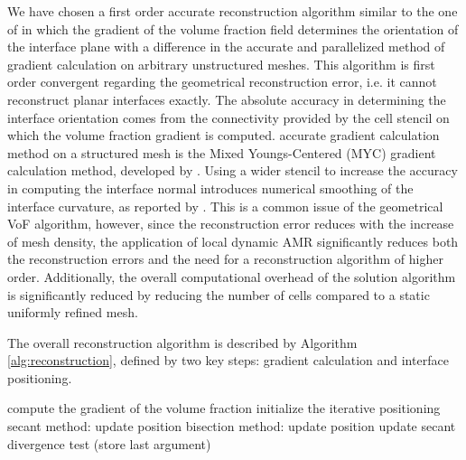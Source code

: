 We have chosen a first order accurate reconstruction algorithm similar to the
one of \citet{ParkerYoungsGradient} in which the gradient of the volume
fraction field determines the orientation of the interface plane with a
difference in the accurate and parallelized method of gradient calculation on
arbitrary unstructured meshes. This algorithm is first order convergent
regarding the geometrical reconstruction error, i.e. it cannot reconstruct
planar interfaces exactly. The absolute accuracy in determining the interface
orientation comes from the connectivity provided by the cell stencil on which
the volume fraction gradient is computed.%
accurate gradient calculation method on a structured mesh is the Mixed
Youngs-Centered (MYC) gradient calculation method, developed by
\citet{Aulisa2007}. Using a wider stencil to increase the accuracy in
computing the interface normal introduces numerical smoothing of the interface
curvature, as reported by \citet{KotheUnstructured1996}. This is a common issue
of the  geometrical VoF algorithm, however, since the reconstruction error
reduces with the increase of mesh density, the application of local dynamic AMR
significantly reduces both the reconstruction errors and the need for a
reconstruction algorithm of higher order. Additionally, the overall
computational overhead of the solution algorithm is significantly reduced by
reducing the number of cells compared to a static uniformly refined mesh. 

The overall reconstruction algorithm is described by Algorithm
\ref{alg:reconstruction}, defined by two key steps: gradient
calculation and interface positioning. 

\begin{algorithm}[H]
    \centering
    \caption{Reconstruction algorithm}
    \label{alg:reconstruction}

    {\small
      \begin{algorithmic}
       \State compute the gradient of the volume fraction
             \State initialize the iterative positioning
                 \State secant method: update position
                     \State bisection method: update position 
                    \EndWhile
                 \EndIf
                 \State update secant divergence test (store last argument)
             \EndWhile
         \EndIf
        \EndFor
      \end{algorithmic}
    }
\end{algorithm}


